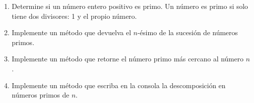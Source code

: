 \begin{enumerate}[label=\alph*)]
    \item Determine si un número entero positivo es primo. Un número es primo si solo tiene dos divisores: 1 y el propio número.
    \item Implemente un método que devuelva el $n$-ésimo de la sucesión de números primos.
    \item Implemente un método que retorne el número primo más cercano al número $n$.
    \item Implemente un método que escriba en la consola la descomposición en números primos de $n$.
\end{enumerate}
